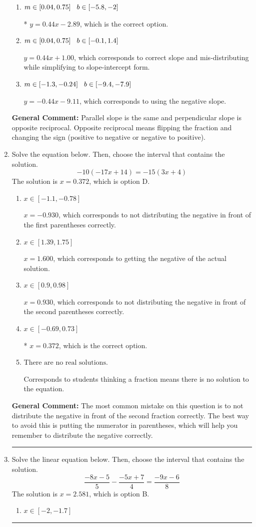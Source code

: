 \documentclass{extbook}[14pt]
\newcommand{\litem}[1]{\item #1

\rule{\textwidth}{0.4pt}}
\begin{document}
\begin{enumerate}
{\begin{enumerate}[label=\Alph*.]
 $y = 2.25x - 2.89$, which corresponds to using the reciprocal slope $(1/m)$.
\item \( m \in [0.04, 0.75] \hspace*{3mm} b \in [-5.8, -2] \)

* $y = 0.44x - 2.89$, which is the correct option.
\item \( m \in [0.04, 0.75] \hspace*{3mm} b \in [-0.1, 1.4] \)

 $y = 0.44x + 1.00$, which corresponds to correct slope and mis-distributing while simplifying to slope-intercept form.
\item \( m \in [-1.3, -0.24] \hspace*{3mm} b \in [-9.4, -7.9] \)

 $y = -0.44x - 9.11$, which corresponds to using the negative slope.
\end{enumerate}

\textbf{General Comment:} Parallel slope is the same and perpendicular slope is opposite reciprocal. Opposite reciprocal means flipping the fraction and changing the sign (positive to negative or negative to positive).
}
\litem{
Solve the equation below. Then, choose the interval that contains the solution.
\[ -10(-17x + 14) = -15(3x + 4) \]
The solution is \( x = 0.372 \), which is option D.\begin{enumerate}[label=\Alph*.]
\item \( x \in [-1.1, -0.78] \)

$x = -0.930$, which corresponds to not distributing the negative in front of the first parentheses correctly.
\item \( x \in [1.39, 1.75] \)

$x = 1.600$, which corresponds to getting the negative of the actual solution.
\item \( x \in [0.9, 0.98] \)

$x = 0.930$, which corresponds to not distributing the negative in front of the second parentheses correctly.
\item \( x \in [-0.69, 0.73] \)

* $x = 0.372$, which is the correct option.
\item \( \text{There are no real solutions.} \)

Corresponds to students thinking a fraction means there is no solution to the equation.
\end{enumerate}

\textbf{General Comment:} The most common mistake on this question is to not distribute the negative in front of the second fraction correctly. The best way to avoid this is putting the numerator in parentheses, which will help you remember to distribute the negative correctly.
}
\litem{
Solve the linear equation below. Then, choose the interval that contains the solution.
\[ \frac{-8x -5}{5} - \frac{-5x + 7}{4} = \frac{-9x -6}{8} \]
The solution is \( x = 2.581 \), which is option B.\begin{enumerate}[label=\Alph*.]
\item \( x \in [-2, -1.7] \)


\end{enumerate}}
\end{enumerate}
\end{document}
